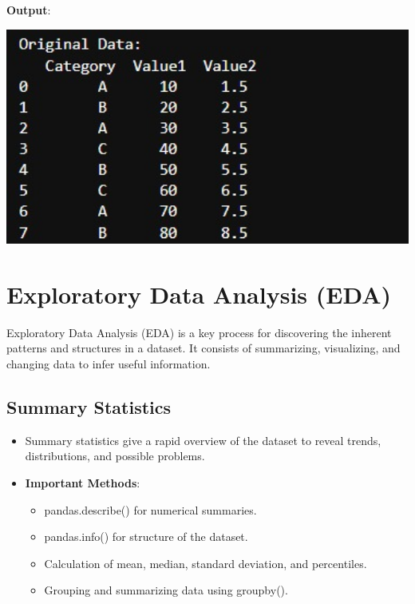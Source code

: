 \documentclass{article}
\begin{document}
\textbf{Output}:

\includegraphics[width=14cm,height=4
cm]{FeatureEngineering_Output.jpeg}


\newpage
\section{Exploratory Data Analysis (EDA)}
Exploratory Data Analysis (EDA) is a key process for discovering the inherent patterns and structures in a dataset. It consists of summarizing, visualizing, and changing data to infer useful information.
\subsection{Summary Statistics}
\begin{itemize}
    \item Summary statistics give a rapid overview of the dataset to reveal trends, distributions, and possible problems.
    \item \textbf{Important Methods}:
    \begin{itemize}
    \item pandas.describe() for numerical summaries.
    \item pandas.info() for structure of the dataset.
    \item Calculation of mean, median, standard deviation, and percentiles.
    \item Grouping and summarizing data using groupby().
    \end{itemize}
\end{itemize}
\end{document}
